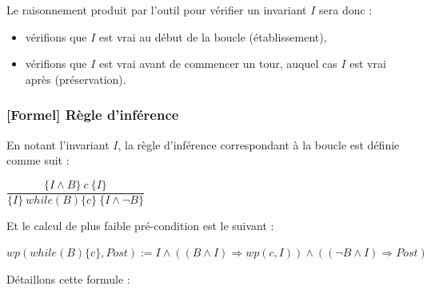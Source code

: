 \documentclass[12pt,francais,]{scrbook}
\providecommand{\tightlist}{%
  \setlength{\itemsep}{0pt}\setlength{\parskip}{0pt}}
\begin{document}
Le raisonnement produit par l'outil pour vérifier un invariant \(I\)
sera donc :

\begin{itemize}
\tightlist
\item
  vérifions que \(I\) est vrai au début de la boucle (établissement),
\item
  vérifions que \(I\) est vrai avant de commencer un tour, auquel cas
  \(I\) est vrai après (préservation).
\end{itemize}

\subsubsection{{[}Formel{]} Règle
d'inférence}\label{formel-ruxe8gle-dinfuxe9rence}

En notant l'invariant \(I\), la règle d'inférence correspondant à la
boucle est définie comme suit :

\begin{center}
\(\dfrac{\{I \wedge B \}\ c\ \{I\}}{\{I\}\ while(B)\{c\}\ \{I \wedge \neg B\}}\)
\end{center}

Et le calcul de plus faible pré-condition est le suivant :

\begin{center}
\(wp(while (B) \{ c \}, Post) := I \wedge ((B \wedge I) \Rightarrow wp(c, I)) \wedge ((\neg B \wedge I) \Rightarrow Post)\)
\end{center}

Détaillons cette formule :
\end{document}
